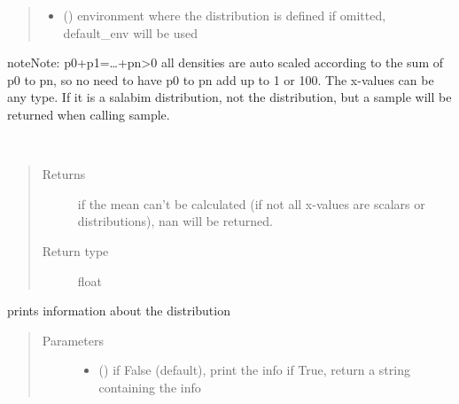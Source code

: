 \documentclass[letterpaper,10pt,english]{sphinxmanual}
\begin{document}
\begin{fulllineitems}
\begin{quote}
\begin{description}
\begin{itemize}
\item {} 
 ({\hyperref[\detokenize{Reference:salabim.Environment}]{}}) \textendash{} environment where the distribution is defined 
if omitted, default\_env will be used

\end{itemize}

\end{description}\end{quote}

\begin{sphinxadmonition}{note}{Note:}
p0+p1=…+pn\textgreater{}0 
all densities are auto scaled according to the sum of p0 to pn,
so no need to have p0 to pn add up to 1 or 100. 
The x-values can be any type. 
If it is a salabim distribution, not the distribution,
but a sample will be returned when calling sample.
\end{sphinxadmonition}

\begin{fulllineitems}
\label{\detokenize{Reference:salabim.Pdf.mean}}~\begin{quote}\begin{description}
\item[{Returns}] \leavevmode
{} \textendash{} if the mean can’t be calculated (if not all x-values are scalars or distributions),
nan will be returned.

\item[{Return type}] \leavevmode
float

\end{description}\end{quote}

\end{fulllineitems}


\begin{fulllineitems}
\label{\detokenize{Reference:salabim.Pdf.print_info}}
prints information about the distribution
\begin{quote}\begin{description}
\item[{Parameters}] \leavevmode\begin{itemize}
\item {} 
 () \textendash{} if False (default), print the info
if True, return a string containing the info


\end{itemize}
\end{description}
\end{quote}
\end{fulllineitems}
\end{fulllineitems}
\end{document}

